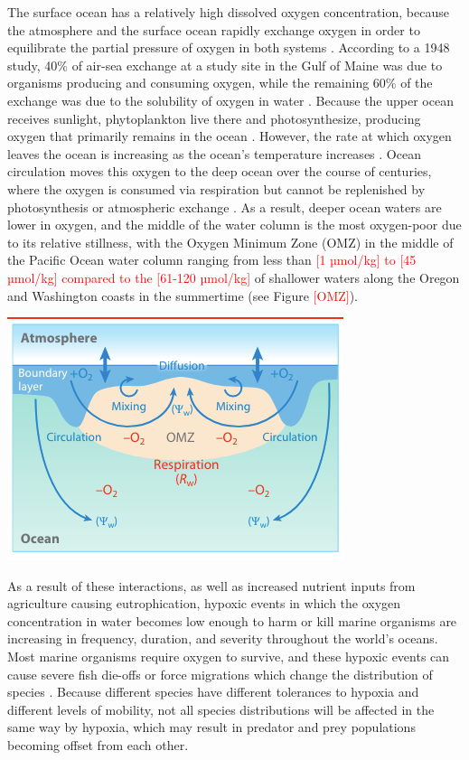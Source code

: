 \documentclass[12pt,twoside]{reedthesis}
\begin{document}
The surface ocean has a relatively high dissolved oxygen concentration, because the atmosphere and the surface ocean rapidly exchange oxygen in order to equilibrate the partial pressure of oxygen in both systems \autocite{Ito2010}. According to a 1948 study, 40\% of air-sea exchange at a study site in the Gulf of Maine was due to organisms producing and consuming oxygen, while the remaining 60\% of the exchange was due to the solubility of oxygen in water \autocite{Redfield1948}. Because the upper ocean receives sunlight, phytoplankton live there and photosynthesize, producing oxygen that primarily remains in the ocean \autocite{Li2020}. However, the rate at which oxygen leaves the ocean is increasing as the ocean's temperature increases \autocite{Li2020}. Ocean circulation moves this oxygen to the deep ocean over the course of centuries, where the oxygen is consumed via respiration but cannot be replenished by photosynthesis or atmospheric exchange \autocite{Karstensen2008, Deutsch2024, Ito2010}. As a result, deeper ocean waters are lower in oxygen, and the middle of the water column is the most oxygen-poor due to its relative stillness, with the Oxygen Minimum Zone (OMZ) in the middle of the Pacific Ocean water column ranging from less than \textcolor{red}{ [1 µmol/kg] to [45 µmol/kg] compared to the  [61-120 µmol/kg]} of shallower waters along the Oregon and Washington coasts in the summertime \autocite{Karstensen2008, Deutsch2024, Barth2024, Pierce2012, Wyrtki1962} (see Figure \textcolor{red}{[OMZ]}).

\includegraphics{Fig_OMZ}

As a result of these interactions, as well as increased nutrient inputs from agriculture causing eutrophication, hypoxic events in which the oxygen concentration in water becomes low enough to harm or kill marine organisms are increasing in frequency, duration, and severity throughout the world's oceans. Most marine organisms require oxygen to survive, and these hypoxic events can cause severe fish die-offs or force migrations which change the distribution of species \autocite{Pihl1991, Miller2002}. Because different species have different tolerances to hypoxia and different levels of mobility, not all species distributions will be affected in the same way by hypoxia, which may result in predator and prey populations becoming offset from each other. 
\end{document}
